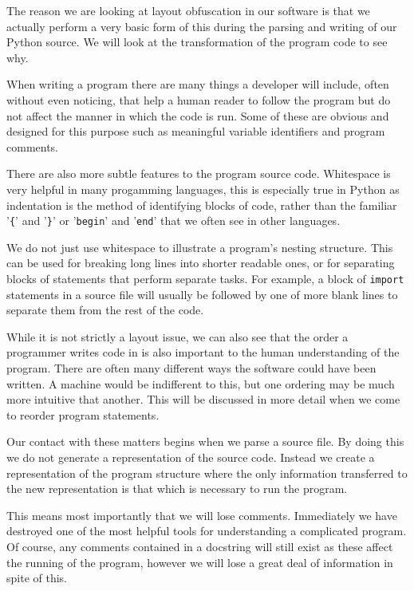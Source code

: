 \documentclass{report}
\begin{document}
The reason we are looking at layout obfuscation in our software is that we actually perform a very basic
form of this during the parsing and writing of our Python source. We will look at the transformation of the
program code to see why.

When writing a program there are many things a developer will include, often without even noticing, that
help a human reader to follow the program but do not affect the manner in which the code is run. Some of
these are obvious and designed for this purpose such as meaningful variable identifiers and program comments.

There are also more subtle features to the program source code. Whitespace is very helpful in many progamming
languages, this is especially true in Python as indentation is the method of identifying blocks of code, rather than
the familiar '\texttt{\{}' and '\texttt{\}}' or '\texttt{begin}' and '\texttt{end}' that we often see in other
languages. 

We do not just use whitespace to illustrate a program's nesting structure. This can be used for breaking long lines
into shorter readable ones, or for separating blocks of statements that perform separate tasks. For example, a block
of \texttt{import} statements in a source file will usually be followed by one of more blank lines to separate them
from the rest of the code.

While it is not strictly a layout issue, we can also see that the order a programmer writes code in is also important
to the human understanding of the program. There are often many different ways the software could have been written.
A machine would be indifferent to this, but one ordering may be much more intuitive that another. This will be discussed
in more detail when we come to reorder program statements.

Our contact with these matters begins when we parse a source file. By doing this we do not generate a representation of
the source code. Instead we create a representation of the program structure where the only information transferred to the
new representation is that which is necessary to run the program.

This means most importantly that we will lose comments. Immediately we have destroyed one of the most helpful tools
for understanding a complicated program. Of course, any comments contained in a docstring will still exist as these
affect the running of the program, however we will lose a great deal of information in spite of this.
\end{document}

